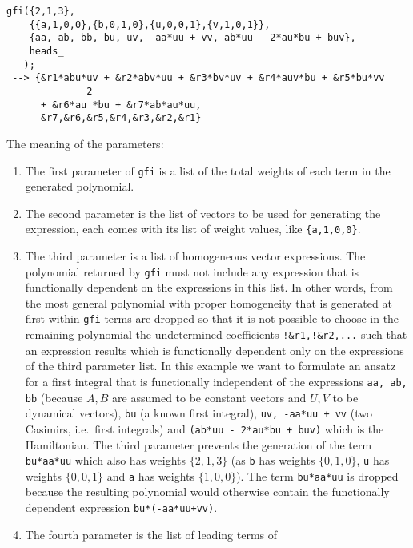 \documentclass[12pt]{article}
\begin{document}
\begin{description}
\begin{verbatim}
gfi({2,1,3},                                    
    {{a,1,0,0},{b,0,1,0},{u,0,0,1},{v,1,0,1}}, 
    {aa, ab, bb, bu, uv, -aa*uu + vv, ab*uu - 2*au*bu + buv},
    heads_                                      
   );
 --> {&r1*abu*uv + &r2*abv*uu + &r3*bv*uv + &r4*auv*bu + &r5*bu*vv 
              2
      + &r6*au *bu + &r7*ab*au*uu,
      &r7,&r6,&r5,&r4,&r3,&r2,&r1} \end{verbatim} 
  The meaning of the parameters: 
        \begin{enumerate} 
          \item The first parameter of {\tt gfi} is a list of the 
                total weights of each term in the generated polynomial. 
          \item The second parameter is the list of vectors to be used
                for generating the expression, each comes 
                with its list of weight values, like {\tt \{a,1,0,0\}}.  
          \item The third parameter is a list of homogeneous vector
                expressions. The polynomial returned by {\tt gfi} must
                not include any expression that is functionally
                dependent on the expressions in this list. In other
                words, from the most general polynomial with proper
                homogeneity that is generated at first within {\tt gfi}
                terms are
                dropped so that it is not possible to choose in the
                remaining polynomial the undetermined coefficients
                {\tt !\&r1,!\&r2,...} such that an expression results
                which is functionally dependent only on the
                expressions of the third parameter list.  In this
                example we want to formulate an ansatz for a first
                integral that is functionally independent of the
                expressions
{\tt aa, ab, bb} (because $A,B$ are assumed to be constant vectors and
$U,V$ to be dynamical vectors), {\tt bu} (a known first integral),
{\tt uv, -aa*uu + vv} (two Casimirs, i.e.\ first integrals) and
{\tt (ab*uu - 2*au*bu + buv)} which is the Hamiltonian.  The third parameter
prevents the generation of the term {\tt bu*aa*uu} which also has weights
$\{2,1,3\}$ (as {\tt b} has weights $\{0,1,0\}$, {\tt u} has weights
$\{0,0,1\}$ and {\tt a} has weights $\{1,0,0\}$). The term {\tt bu*aa*uu}
is dropped because the resulting polynomial would otherwise contain the
functionally dependent expression {\tt bu*(-aa*uu+vv)}.
          \item The fourth parameter is the list of leading terms of

\end{enumerate}
\end{description}
\end{document}
